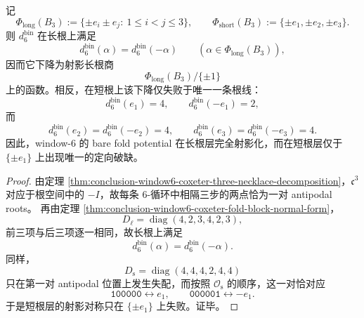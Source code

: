 \begin{corollary}[长根射影商与唯一短根定向缺陷]\label{cor:conclusion-window6-long-root-projective-short-root-defect}
记
\[
\Phi_{\mathrm{long}}(B_3):=\{\pm e_i\pm e_j:\ 1\le i<j\le 3\},
\qquad
\Phi_{\mathrm{short}}(B_3):=\{\pm e_1,\pm e_2,\pm e_3\}.
\]
则 \(d_6^{\mathrm{bin}}\) 在长根上满足
\[
d_6^{\mathrm{bin}}(\alpha)=d_6^{\mathrm{bin}}(-\alpha)
\qquad (\alpha\in \Phi_{\mathrm{long}}(B_3)),
\]
因而它下降为射影长根商
\[
\Phi_{\mathrm{long}}(B_3)/\{\pm 1\}
\]
上的函数。相反，在短根上该下降仅失败于唯一一条根线：
\[
d_6^{\mathrm{bin}}(e_1)=4,\qquad d_6^{\mathrm{bin}}(-e_1)=2,
\]
而
\[
d_6^{\mathrm{bin}}(e_2)=d_6^{\mathrm{bin}}(-e_2)=4,\qquad
d_6^{\mathrm{bin}}(e_3)=d_6^{\mathrm{bin}}(-e_3)=4.
\]
因此，window-\(6\) 的 bare fold potential 在长根层完全射影化，而在短根层仅于 \(\{\pm e_1\}\) 上出现唯一的定向破缺。
\end{corollary}
\begin{proof}
由定理 \ref{thm:conclusion-window6-coxeter-three-necklace-decomposition}，\(\mathfrak c^3\) 对应于根空间中的 \(-I\)，故每条 \(6\)-循环中相隔三步的两点恰为一对 antipodal roots。
再由定理 \ref{thm:conclusion-window6-coxeter-fold-block-normal-form}，
\[
D_{\ell}=\operatorname{diag}(4,2,3,4,2,3),
\]
前三项与后三项逐一相同，故长根上满足
\[
d_6^{\mathrm{bin}}(\alpha)=d_6^{\mathrm{bin}}(-\alpha).
\]
同样，
\[
D_{\mathrm{s}}=\operatorname{diag}(4,4,4,2,4,4)
\]
只在第一对 antipodal 位置上发生失配，而按照 \(\mathcal O_{\mathrm{s}}\) 的顺序，这一对恰对应
\[
\texttt{100000}\leftrightarrow e_1,\qquad
\texttt{000001}\leftrightarrow -e_1.
\]
于是短根层的射影对称只在 \(\{\pm e_1\}\) 上失败。证毕。
\end{proof}

